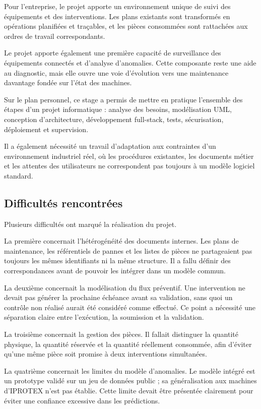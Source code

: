 Pour l’entreprise, le projet apporte un environnement unique de suivi des équipements et des interventions. Les plans existants sont transformés en opérations planifiées et traçables, et les pièces consommées sont rattachées aux ordres de travail correspondants.

Le projet apporte également une première capacité de surveillance des équipements connectés et d’analyse d’anomalies. Cette composante reste une aide au diagnostic, mais elle ouvre une voie d’évolution vers une maintenance davantage fondée sur l’état des machines.

Sur le plan personnel, ce stage a permis de mettre en pratique l’ensemble des étapes d’un projet informatique : analyse des besoins, modélisation UML, conception d’architecture, développement full-stack, tests, sécurisation, déploiement et supervision.

Il a également nécessité un travail d’adaptation aux contraintes d’un environnement industriel réel, où les procédures existantes, les documents métier et les attentes des utilisateurs ne correspondent pas toujours à un modèle logiciel standard.

\subsection*{Difficultés rencontrées}

Plusieurs difficultés ont marqué la réalisation du projet.

La première concernait l’hétérogénéité des documents internes. Les plans de maintenance, les référentiels de pannes et les listes de pièces ne partageaient pas toujours les mêmes identifiants ni la même structure. Il a fallu définir des correspondances avant de pouvoir les intégrer dans un modèle commun.

La deuxième concernait la modélisation du flux préventif. Une intervention ne devait pas générer la prochaine échéance avant sa validation, sans quoi un contrôle non réalisé aurait été considéré comme effectué. Ce point a nécessité une séparation claire entre l’exécution, la soumission et la validation.

La troisième concernait la gestion des pièces. Il fallait distinguer la quantité physique, la quantité réservée et la quantité réellement consommée, afin d’éviter qu’une même pièce soit promise à deux interventions simultanées.

La quatrième concernait les limites du modèle d’anomalies. Le modèle intégré est un prototype validé sur un jeu de données public ; sa généralisation aux machines d’IPROTEX n’est pas établie. Cette limite devait être présentée clairement pour éviter une confiance excessive dans les prédictions.

